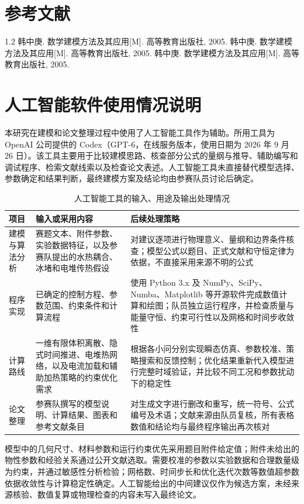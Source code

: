 \documentclass[bwprint]{gmcmthesis}
\numberwithin{figure}{section}
\begin{document}
\section{参考文献}
\begin{thebibliography}{1.2}%
\setlength{\itemsep}{-2mm}
 韩中庚. 数学建模方法及其应用[M]. 高等教育出版社, 2005.
 韩中庚. 数学建模方法及其应用[M]. 高等教育出版社, 2005.
 韩中庚. 数学建模方法及其应用[M]. 高等教育出版社, 2005.
\end{thebibliography}

\newpage

\appendix
\section{人工智能软件使用情况说明}

本研究在建模和论文整理过程中使用了人工智能工具作为辅助。所用工具为 OpenAI 公司提供的 Codex（GPT-6，在线服务版本，使用日期为 2026 年 9 月 26 日）。该工具主要用于比较建模思路、核查部分公式的量纲与推导、辅助编写和调试程序、检索文献线索以及检查论文表述。人工智能工具未直接替代模型选择、参数确定和结果判断，最终建模方案及结论均由参赛队员讨论后确定。

\begin{table}[htbp]
    \centering
    \caption{人工智能工具的输入、用途及输出处理情况}
    \label{tab:ai_disclosure}
    \small
    \renewcommand{\arraystretch}{1.25}
    \setlength{\tabcolsep}{5pt}
    \begin{tabular}{p{2.7cm}p{5.0cm}p{7.0cm}}
        \toprule
        项目 & 输入或采用内容 & 后续处理策略 \\
        \midrule
        建模与算法分析 & 赛题文本、附件参数、实验数据特征，以及参赛队提出的水热耦合、冰堵和电堆传热假设 & 对建议逐项进行物理意义、量纲和边界条件核查；模型公式以题目、正式文献和守恒定律为依据，不直接采用来源不明的公式 \\
        程序实现 & 已确定的控制方程、参数范围、约束条件和计算流程 & 使用 Python 3.x 及 NumPy、SciPy、Numba、Matplotlib 等开源软件完成数值计算和绘图；队员独立运行程序，并检查质量与能量守恒、约束可行性以及网格和时间步收敛性 \\
        计算路线 & 一维有限体积离散、隐式时间推进、电堆热网络，以及电流加载和辅助加热策略的约束优化需求 & 根据各小问分别实现瞬态仿真、参数校准、策略搜索和反馈控制；优化结果重新代入模型进行完整时域验证，并比较不同工况和参数扰动下的稳定性 \\
        论文整理 & 参赛队撰写的模型说明、计算结果、图表和参考文献条目 & 对生成文字进行删改和重写，统一符号、公式编号及术语；文献来源由队员复核，所有表格数值和结论均与最终程序输出再次核对 \\
        \bottomrule
    \end{tabular}
\end{table}

模型中的几何尺寸、材料参数和运行约束优先采用题目附件给定值；附件未给出的物性参数和经验关系通过公开文献选取。需要校准的参数以实验数据和合理数量级为约束，并通过敏感性分析检验；网格数、时间步长和优化迭代次数等数值超参数依据收敛性与计算稳定性确定。人工智能给出的中间建议仅作为候选方案，未经来源核验、数值复算或物理检查的内容未写入最终论文。
\end{document}

